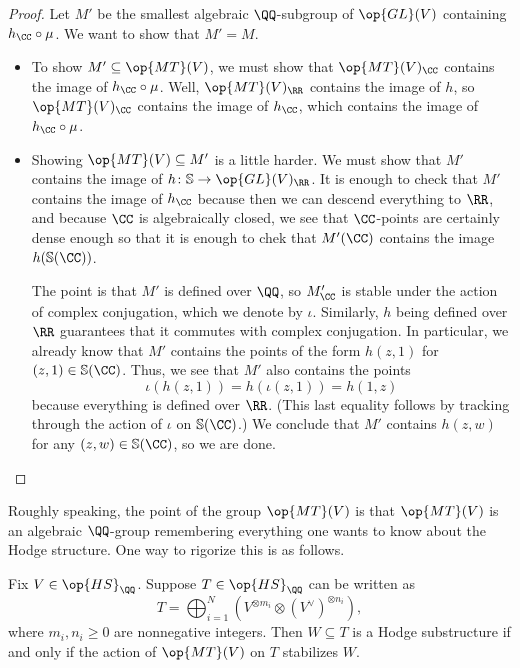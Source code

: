\documentclass[../thesis.tex]{subfiles}
\begin{document}
\begin{proof}
	Let $M'$ be the smallest algebraic $\QQ$-subgroup of $\op{GL}(V)$ containing $h_\CC\circ\mu$. We want to show that $M'=M$.
	\begin{itemize}
		\item To show $M'\subseteq\op{MT}(V)$, we must show that $\op{MT}(V)_\CC$ contains the image of $h_\CC\circ\mu$. Well, $\op{MT}(V)_\RR$ contains the image of $h$, so $\op{MT}(V)_\CC$ contains the image of $h_\CC$, which contains the image of $h_\CC\circ\mu$.

		\item Showing $\op{MT}(V)\subseteq M'$ is a little harder. We must show that $M'$ contains the image of $h\colon\mathbb S\to\op{GL}(V)_\RR$. It is enough to check that $M'$ contains the image of $h_\CC$ because then we can descend everything to $\RR$, and because $\CC$ is algebraically closed, we see that $\CC$-points are certainly dense enough so that it is enough to chek that $M'(\CC)$ contains the image $h(\mathbb S(\CC))$.
		
		The point is that $M'$ is defined over $\QQ$, so $M'_\CC$ is stable under the action of complex conjugation, which we denote by $\iota$. Similarly, $h$ being defined over $\RR$ guarantees that it commutes with complex conjugation. In particular, we already know that $M'$ contains the points of the form $h(z,1)$ for $(z,1)\in\mathbb S(\CC)$. Thus, we see that $M'$ also contains the points
		\[\iota(h(z,1))=h(\iota(z,1))=h(1,z)\]
		because everything is defined over $\RR$. (This last equality follows by tracking through the action of $\iota$ on $\mathbb S(\CC)$.) We conclude that $M'$ contains $h(z,w)$ for any $(z,w)\in\mathbb S(\CC)$, so we are done.
		\qedhere
	\end{itemize}
\end{proof}
Roughly speaking, the point of the group $\op{MT}(V)$ is that $\op{MT}(V)$ is an algebraic $\QQ$-group remembering everything one wants to know about the Hodge structure. One way to rigorize this is as follows.
\begin{proposition} \label{prop:tensors-of-mt}
	Fix $V\in\op{HS}_\QQ$. Suppose $T\in\op{HS}_\QQ$ can be written as
	\[T=\bigoplus_{i=1}^N\left(V^{\otimes m_i}\otimes (V^\lor)^{\otimes n_i}\right),\]
	where $m_i,n_i\ge0$ are nonnegative integers. Then $W\subseteq T$ is a Hodge substructure if and only if the action of $\op{MT}(V)$ on $T$ stabilizes $W$.
\end{proposition}
\end{document}
